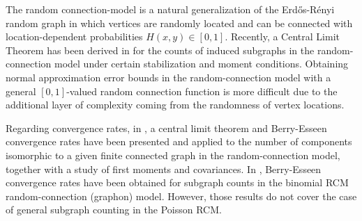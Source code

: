 \documentclass[12pt]{article}
\numberwithin{equation}{section}
\begin{document}
\medskip 
  
 The random connection-model is a natural generalization of the %
 Erd\H os-R\'enyi random graph in which vertices are randomly located
 and can be connected
 with location-dependent probabilities
 $H(x,y)\in [0,1]$.
 Recently, a Central Limit Theorem has been derived in \cite{can2022} for the counts of induced subgraphs in the random-connection model under certain stabilization and moment conditions. 
 Obtaining normal approximation error bounds 
 in the random-connection model
 with a general $[0,1]$-valued random connection function 
 is more difficult due to the additional layer of complexity coming from
 the randomness of vertex locations.
 
\medskip 
   
 Regarding convergence rates, in \cite{LNS21},
 a central limit theorem and Berry-Esseen convergence rates have
 been presented and applied to the number of components isomorphic
 to a given finite connected graph in the random-connection model,
 together with a study of ﬁrst moments and covariances.
 In \cite{zhangzs}, Berry-Esseen convergence rates have
 been obtained for subgraph counts
 in the binomial RCM random-connection (graphon) model. 
 However, those results do not cover the case of
 general subgraph counting in the Poisson RCM. 

\medskip 
 
\end{document}
